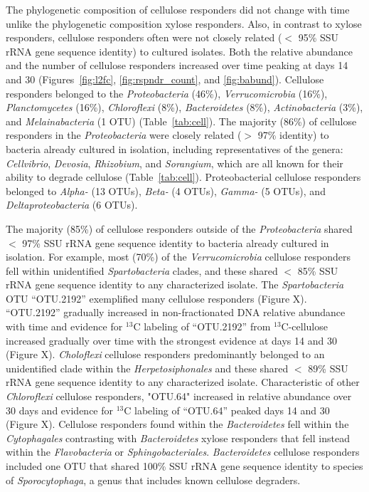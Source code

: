 The phylogenetic composition of cellulose responders did not change with
time unlike the phylogenetic composition xylose responders. Also, in
contrast to xylose responders, cellulose responders often were not closely
related ($<$ 95\% SSU rRNA gene sequence identity) to cultured isolates.
Both the relative abundance and the number of cellulose responders
increased over time peaking at days 14 and 30 (Figures~\ref{fig:l2fc},
\ref{fig:rspndr_count}, and \ref{fig:babund}). Cellulose responders belonged to the
\textit{Proteobacteria} (46\%), \textit{Verrucomicrobia} (16\%),
\textit{Planctomycetes} (16\%), \textit{Chloroflexi} (8\%),
\textit{Bacteroidetes} (8\%), \textit{Actinobacteria} (3\%), and
\textit{Melainabacteria} (1 OTU) (Table~\ref{tab:cell}). The majority (86\%)
of cellulose responders in the \textit{Proteobacteria} were closely related
($>$ 97\% identity) to bacteria already cultured in isolation, including
representatives of the genera: \textit{Cellvibrio}, \textit{Devosia},
\textit{Rhizobium}, and \textit{Sorangium}, which are all known for their
ability to degrade cellulose (Table~\ref{tab:cell}). Proteobacterial cellulose
responders belonged to \textit{Alpha-} (13 OTUs), \textit{Beta-} (4 OTUs),
\textit{Gamma-} (5 OTUs), and \textit{Deltaproteobacteria} (6 OTUs). 

The majority (85\%) of cellulose responders outside of the
\textit{Proteobacteria} shared  $<$ 97\% SSU rRNA gene sequence identity to
bacteria already cultured in isolation. For example, most (70\%) of the
\textit{Verrucomicrobia} cellulose responders fell within unidentified
\textit{Spartobacteria} clades, and these shared $<$ 85\% SSU rRNA gene
sequence identity to any characterized isolate. The \textit{Spartobacteria} OTU
``OTU.2192'' exemplified many cellulose responders (Figure X). ``OTU.2192''
gradually increased in non-fractionated DNA relative abundance with time and
evidence for $^{13}$C labeling of ``OTU.2192'' from $^{13}$C-cellulose
increased gradually over time with the strongest evidence at days 14 and
30 (Figure X). \textit{Choloflexi} cellulose responders predominantly belonged
to an unidentified clade within the \textit{Herpetosiphonales} and these
shared $<$ 89\% SSU rRNA gene sequence identity to any characterized
isolate. Characteristic of other \textit{Chloroflexi} cellulose responders,
"OTU.64" increased in relative abundance over 30 days and evidence for
$^{13}$C labeling of ``OTU.64'' peaked days 14 and 30 (Figure X).
Cellulose responders found within the \textit{Bacteroidetes} fell within
the \textit{Cytophagales} contrasting with \textit{Bacteroidetes} xylose
responders that fell instead within the \textit{Flavobacteria} or
\textit{Sphingobacteriales}. \textit{Bacteroidetes} cellulose responders
included one OTU that shared 100\% SSU rRNA gene sequence identity to
species of \textit{Sporocytophaga}, a genus that includes known cellulose
degraders.

